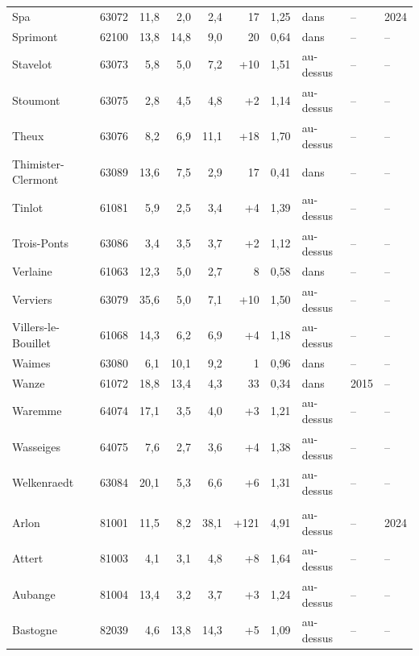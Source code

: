 \begin{longtable}{lrrrrrrlll}
Spa & 63072 & 11{,}8 & 2{,}0 & \textminus{}2{,}4 & \textminus{}17 & \textminus{}1{,}25 & dans & -- & 2024 \\
Sprimont & 62100 & 13{,}8 & 14{,}8 & 9{,}0 & \textminus{}20 & 0{,}64 & dans & -- & -- \\
Stavelot & 63073 & 5{,}8 & 5{,}0 & 7{,}2 & +10 & 1{,}51 & au-dessus & -- & -- \\
Stoumont & 63075 & 2{,}8 & 4{,}5 & 4{,}8 & +2 & 1{,}14 & au-dessus & -- & -- \\
Theux & 63076 & 8{,}2 & 6{,}9 & 11{,}1 & +18 & 1{,}70 & au-dessus & -- & -- \\
Thimister-Clermont & 63089 & 13{,}6 & 7{,}5 & 2{,}9 & \textminus{}17 & 0{,}41 & dans & -- & -- \\
Tinlot & 61081 & 5{,}9 & 2{,}5 & 3{,}4 & +4 & 1{,}39 & au-dessus & -- & -- \\
Trois-Ponts & 63086 & 3{,}4 & 3{,}5 & 3{,}7 & +2 & 1{,}12 & au-dessus & -- & -- \\
Verlaine & 61063 & 12{,}3 & 5{,}0 & 2{,}7 & \textminus{}8 & 0{,}58 & dans & -- & -- \\
Verviers & 63079 & 35{,}6 & 5{,}0 & 7{,}1 & +10 & 1{,}50 & au-dessus & -- & -- \\
Villers-le-Bouillet & 61068 & 14{,}3 & 6{,}2 & 6{,}9 & +4 & 1{,}18 & au-dessus & -- & -- \\
Waimes & 63080 & 6{,}1 & 10{,}1 & 9{,}2 & \textminus{}1 & 0{,}96 & dans & -- & -- \\
Wanze & 61072 & 18{,}8 & 13{,}4 & 4{,}3 & \textminus{}33 & 0{,}34 & dans & 2015 & -- \\
Waremme & 64074 & 17{,}1 & 3{,}5 & 4{,}0 & +3 & 1{,}21 & au-dessus & -- & -- \\
Wasseiges & 64075 & 7{,}6 & 2{,}7 & 3{,}6 & +4 & 1{,}38 & au-dessus & -- & -- \\
Welkenraedt & 63084 & 20{,}1 & 5{,}3 & 6{,}6 & +6 & 1{,}31 & au-dessus & -- & -- \\
\addlinespace
\multicolumn{10}{l}{\textbf{Luxembourg} (43 communes)} \\
Arlon & 81001 & 11{,}5 & 8{,}2 & 38{,}1 & +121 & 4{,}91 & au-dessus & -- & 2024 \\
Attert & 81003 & 4{,}1 & 3{,}1 & 4{,}8 & +8 & 1{,}64 & au-dessus & -- & -- \\
Aubange & 81004 & 13{,}4 & 3{,}2 & 3{,}7 & +3 & 1{,}24 & au-dessus & -- & -- \\
Bastogne & 82039 & 4{,}6 & 13{,}8 & 14{,}3 & +5 & 1{,}09 & au-dessus & -- & -- \\

\end{longtable}
